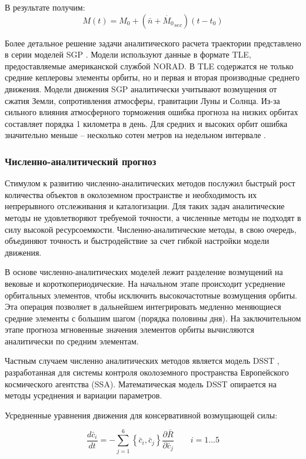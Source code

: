 В результате получим:
\begin{equation*}
    M(t) = M_0 + (\bar{n} + \dot{M_0}_{sec}) (t - t_0)
\end{equation*}

Более детальное решение задачи аналитического расчета траектории представлено в серии моделей SGP \cite{spacetrack80}.
Модели используют данные в формате TLE, предоставляемые американской службой NORAD. 
В TLE содержатся не только средние кеплеровы элементы орбиты, но и первая и вторая производные среднего движения.
Модели движения SGP аналитически учитывают возмущения от сжатия Земли, сопротивления атмосферы, гравитации Луны и Солнца.
Из-за сильного влияния атмосферного торможения ошибка прогноза на низких орбитах составляет порядка 1 километра в день.
Для средних и высоких орбит ошибка значительно меньше -- несколько сотен метров на недельном интервале \cite{vallado2008}. 

\subsubsection{Численно-аналитический прогноз}
Стимулом к развитию численно-аналитических методов послужил быстрый рост количества
объектов в околоземном пространстве и необходимость их непрерывного отслеживания и каталогизации.
Для таких задач аналитические методы не удовлетворяют требуемой точности, а численные методы
не подходят в силу высокой ресурсоемкости. Численно-аналитические методы, в свою очередь,
объединяют точность и быстродействие за счет гибкой настройки модели движения.

В основе численно-аналитических моделей лежит разделение возмущений на вековые и короткопериодические.
На начальном этапе происходит усреднение орбитальных элементов, 
чтобы исключить высокочастотные возмущения орбиты. Эта операция позволяет в дальнейшем
интегрировать медленно меняющиеся средние элементы с большим шагом (порядка половины дня).
На заключительном этапе прогноза мгновенные значения элементов орбиты вычисляются аналитически по средним элементам.

Частным случаем численно аналитических методов является модель DSST \cite{danielson1995}, разработанная для
системы контроля околоземного пространства Европейского космического агентства (SSA).
Математическая модель DSST опирается на методы усреднения и вариации параметров.

Усредненные уравнения движения для консервативной возмущающей силы:

\begin{equation*}
    \frac{d\bar{c}_i}{dt} = -\sum_{j=1}^{6} \left\{\bar{c}_i, \bar{c}_j \right\} 
                                \frac{\partial \bar{R}}{\partial\bar{c}_j} \qquad i=1 \dots 5
\end{equation*}

